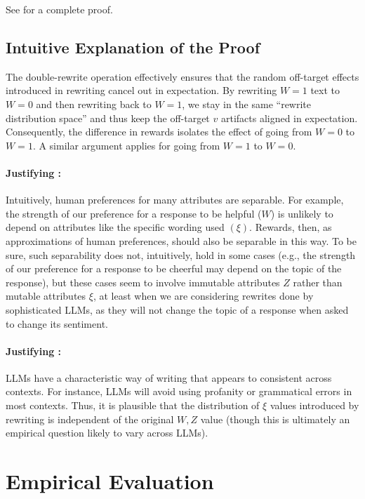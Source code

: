 See  for a complete proof.

\subsection{Intuitive Explanation of the Proof}
The double-rewrite operation effectively ensures that the random off-target effects introduced in rewriting cancel out in expectation. By rewriting $W=1$ text to $W=0$ and then rewriting back to $W=1$, we stay in the same ``rewrite distribution space'' and thus keep the off-target $v$ artifacts aligned in expectation. Consequently, the difference in rewards isolates the effect of going from $W=0$ to $W=1$. A similar argument applies for going from $W=1$ to $W=0$.

\paragraph{Justifying :} Intuitively, human preferences for many attributes are separable. For example, the strength of our preference for a response to be helpful ($W$) is unlikely to depend on attributes like the specific wording used $(\xi)$. Rewards, then, as approximations of human preferences, should also be separable in this way. To be sure, such separability does not, intuitively, hold in some cases (e.g., the strength of our preference for a response to be cheerful may depend on the topic of the response), but these cases seem to involve immutable attributes $Z$ rather than mutable attributes $\xi$, at least when we are considering rewrites done by sophisticated LLMs, as they will not change the topic of a response when asked to change its sentiment.

\paragraph{Justifying :} LLMs have a characteristic way of writing that appears to consistent across contexts. For instance, LLMs will avoid using profanity or grammatical errors in most contexts. Thus, it is plausible that the distribution of $\xi$ values introduced by rewriting is independent of the original $W, Z$ value (though this is ultimately an empirical question likely to vary across LLMs).

\section{Empirical Evaluation}
\label{sec:experiments}

